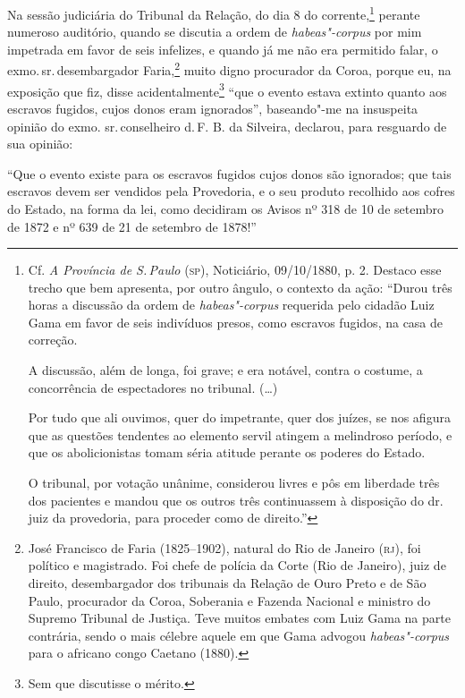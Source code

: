 Na sessão judiciária do Tribunal da Relação, do dia 8 do
corrente,\footnote{Cf. \emph{A Província de S.\,Paulo} (\textsc{sp}), Noticiário,
  09/10/1880, p. 2. Destaco esse trecho que bem apresenta, por outro
  ângulo, o contexto da ação: ``Durou três horas a discussão da ordem de
  \emph{habeas"-corpus} requerida pelo cidadão Luiz Gama em favor de seis
  indivíduos presos, como escravos fugidos, na casa de correção.

  A discussão, além de longa, foi grave; e era notável, contra o
  costume, a concorrência de espectadores no tribunal. (\ldots{})

  Por tudo que ali ouvimos, quer do impetrante, quer dos juízes, se nos
  afigura que as questões tendentes ao elemento servil atingem a
  melindroso período, e que os abolicionistas tomam séria atitude
  perante os poderes do Estado.

  O tribunal, por votação unânime, considerou livres e pôs em liberdade
  três dos pacientes e mandou que os outros três continuassem à
  disposição do dr.\,juiz da provedoria, para proceder como de direito.''}
perante numeroso auditório, quando se discutia a ordem de
\emph{habeas"-corpus} por mim impetrada em favor de seis infelizes, e
quando já me não era permitido falar, o exmo.\,sr.\,desembargador
Faria,\footnote{José Francisco de Faria (1825--1902), natural do Rio de \label{jff}
  Janeiro (\textsc{rj}), foi político e magistrado. Foi chefe de polícia da Corte
  (Rio de Janeiro), juiz de direito, desembargador dos tribunais da
  Relação de Ouro Preto e de São Paulo, procurador da Coroa, Soberania e
  Fazenda Nacional e ministro do Supremo Tribunal de Justiça. Teve
  muitos embates com Luiz Gama na parte contrária, sendo o mais célebre
  aquele em que Gama advogou \emph{habeas"-corpus} para o africano congo
  Caetano (1880).} muito digno procurador da Coroa, porque eu, na
exposição que fiz, disse acidentalmente\footnote{Sem que discutisse o
  mérito.} ``que o evento estava extinto quanto aos escravos fugidos,
cujos donos eram ignorados'', baseando"-me na insuspeita opinião do exmo.
sr.\,conselheiro d.\,F. B. da Silveira, declarou, para resguardo de sua
opinião:

``Que o evento existe para os escravos fugidos cujos donos são ignorados;
que tais escravos devem ser vendidos pela Provedoria, e o seu produto
recolhido aos cofres do Estado, na forma da lei, como decidiram os
Avisos nº 318 de 10 de setembro de 1872 e nº 639 de 21 de setembro de
1878!''



